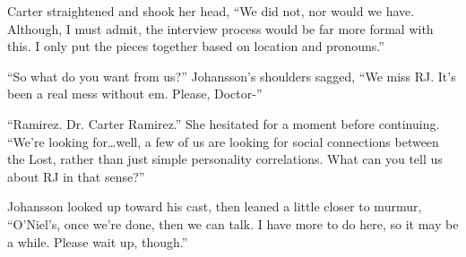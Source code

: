 Carter straightened and shook her head, ``We did not, nor would we have.  Although, I must admit, the interview process would be far more formal with this.  I only put the pieces together based on location and pronouns.''

``So what do you want from us?''  Johansson's shoulders sagged, ``We miss RJ.  It's been a real mess without em.  Please, Doctor-''

``Ramirez.  Dr. Carter Ramirez.''  She hesitated for a moment before continuing.  ``We're looking for\ldots{}well, a few of us are looking for social connections between the Lost, rather than just simple personality correlations.  What can you tell us about RJ in that sense?''

Johansson looked up toward his cast, then leaned a little closer to murmur, ``O'Niel's, once we're done, then we can talk.  I have more to do here, so it may be a while.  Please wait up, though.''
